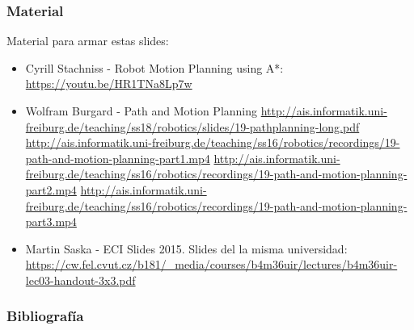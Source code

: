 \begin{frame}
	\frametitle{Material}
	
	Material para armar estas slides:
	\begin{itemize}
		\item Cyrill Stachniss - Robot Motion Planning using A*: \url{https://youtu.be/HR1TNa8Lp7w}
		\item Wolfram Burgard - Path and Motion Planning \url{http://ais.informatik.uni-freiburg.de/teaching/ss18/robotics/slides/19-pathplanning-long.pdf}
		\url{http://ais.informatik.uni-freiburg.de/teaching/ss16/robotics/recordings/19-path-and-motion-planning-part1.mp4}
		\url{http://ais.informatik.uni-freiburg.de/teaching/ss16/robotics/recordings/19-path-and-motion-planning-part2.mp4}
		\url{http://ais.informatik.uni-freiburg.de/teaching/ss16/robotics/recordings/19-path-and-motion-planning-part3.mp4}
		\item Martin Saska - ECI Slides 2015. Slides del la misma universidad: \url{https://cw.fel.cvut.cz/b181/_media/courses/b4m36uir/lectures/b4m36uir-lec03-handout-3x3.pdf}
	\end{itemize}
\end{frame}

\begin{frame}
	\frametitle{Bibliografía}
	\nocite{choset2005principles}
	
	\nocite{siegwart2011introduction}

	\nocite{latombe1991robot}

	\nocite{lynch2017modern}
	
	\printbibliography
	
\end{frame}